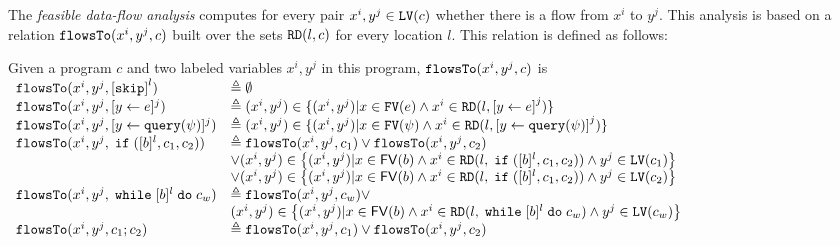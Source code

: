 The {\em feasible data-flow analysis} computes for every pair $x^i, y^j \in \mathtt{LV}(c)$
 whether there is a flow from $x^i$ to $y^j$. 
 This analysis is based on a relation $\mathtt{flowsTo}(x^i, y^j, c)$ built over the sets $\mathtt{RD}(l, c)$ for every location $l$. 
 This relation is defined  as follows:
\begin{defn}
  \label{def:feasible_flowsto}
  Given a program $c$ and two labeled variables $x^i, y^j$  in this program, 
  $\mathtt{flowsTo}(x^i, y^j, c)$ is 
  \\
    {\footnotesize
$  \begin{array}{ll}
  \flowsto(x^i, y^j, \clabel{\eskip}^{l}) 
  &\triangleq \emptyset \\
  \flowsto(x^i, y^j, \clabel{\assign{y}{\expr}}{}^j) 
  & \triangleq (x^i, y^j) \in \{ (x^i, y^j) | x \in \kw{FV}(\expr) 
  \land x^i \in \live(l, \clabel{\assign{y}{\expr}}^j) \} \\
  \flowsto(x^i, y^j, \clabel{\assign{y}{\query(\qexpr)}}{}^j) 
  & \triangleq (x^i, y^j) \in \{ (x^i, y^j) | x \in \kw{FV}(\qexpr) 
  \land x^i \in \live(l,\clabel{\assign{y}{\query(\qexpr)}}^j) \} \\
    \flowsto(x^i, y^j, \eif ([b]^l, c_1, c_2))  & \triangleq \flowsto(x^i, y^j, c_1) \lor \flowsto(x^i, y^j, c_2) \\ 
        & \lor (x^i, y^j) \in
        \left\{(x^i,y^j) | x \in \mathsf{FV}(b) \land 
      x^i \in \live(l, \eif ([b]^l, c_1, c_2)) \land  y^j \in \lvar(c_1) \right\} \\
       &\lor (x^i, y^j) \in \left\{(x^i,y^j) | x \in \mathsf{FV}(b) \land 
      x^i\in \live(l, \eif ([b]^l, c_1, c_2))  \land  y^j \in \lvar(c_2)  \right\} \\
       \flowsto(x^i, y^j, \ewhile [b]^l \edo c_w)  & \triangleq  \flowsto(x^i, y^j, c_w)  \lor
       \\ & 
       (x^i, y^j) \in  \left\{(x^i,y^j) | x \in \mathsf{FV}(b) \land 
      x^i \in \live(l,   \ewhile [b]^l \edo c_w) \land  y^j \in \lvar(c_w) \right\} \\
       \flowsto(x^i, y^j, c_1 ;c_2)  & \triangleq \flowsto(x^i, y^j, c_1) \lor \flowsto(x^i, y^j, c_2) \\
   \end{array}$
   }
   \end{defn}
